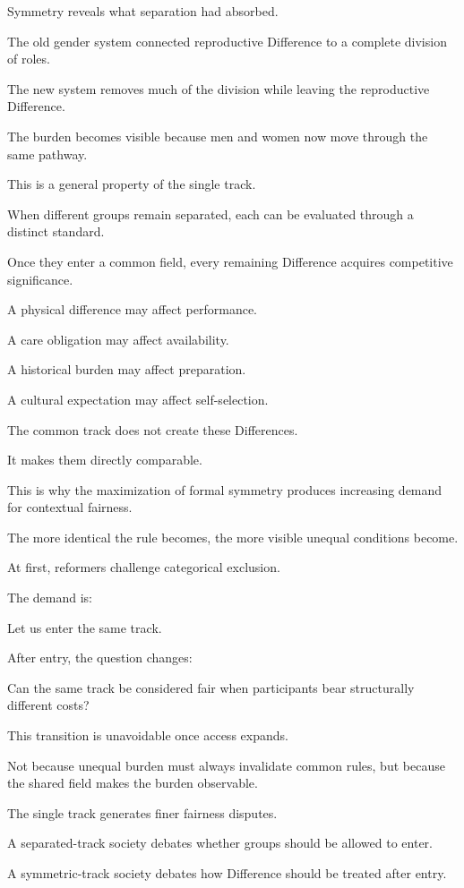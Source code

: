 Symmetry reveals what separation had absorbed.

The old gender system connected reproductive Difference to a complete division of roles.

The new system removes much of the division while leaving the reproductive Difference.

The burden becomes visible because men and women now move through the same pathway.

This is a general property of the single track.

When different groups remain separated, each can be evaluated through a distinct standard.

Once they enter a common field, every remaining Difference acquires competitive significance.

A physical difference may affect performance.

A care obligation may affect availability.

A historical burden may affect preparation.

A cultural expectation may affect self-selection.

The common track does not create these Differences.

It makes them directly comparable.

This is why the maximization of formal symmetry produces increasing demand for contextual fairness.

The more identical the rule becomes, the more visible unequal conditions become.

At first, reformers challenge categorical exclusion.

The demand is:

Let us enter the same track.

After entry, the question changes:

Can the same track be considered fair when participants bear structurally different costs?

This transition is unavoidable once access expands.

Not because unequal burden must always invalidate common rules, but because the shared field makes the burden observable.

The single track generates finer fairness disputes.

A separated-track society debates whether groups should be allowed to enter.

A symmetric-track society debates how Difference should be treated after entry.

